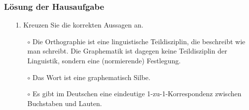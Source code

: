 
\begin{frame}%
\frametitle{Lösung der Hausaufgabe}

\begin{itemize}
	
	\item[1.] Kreuzen Sie die korrekten Aussagen an.
	
	\begin{itemize}
		\item[$\circ$] Die Orthographie ist eine linguistische Teildisziplin, die beschreibt wie man schreibt. Die Graphematik ist dagegen keine Teildisziplin der Linguistik, sondern eine  (normierende) Festlegung.
		
		\item[\alertgreen{$\checkmark$}] 
		
		\item[$\circ$] Das Wort  ist eine graphematisch  Silbe.
		
		\item[$\circ$] Es gibt im Deutschen eine eindeutige 1-zu-1-Korrespondenz zwischen Buchstaben und Lauten.
		
		\item[\alertgreen{$\checkmark$}] 
	\end{itemize}
\end{itemize}
\end{frame}


